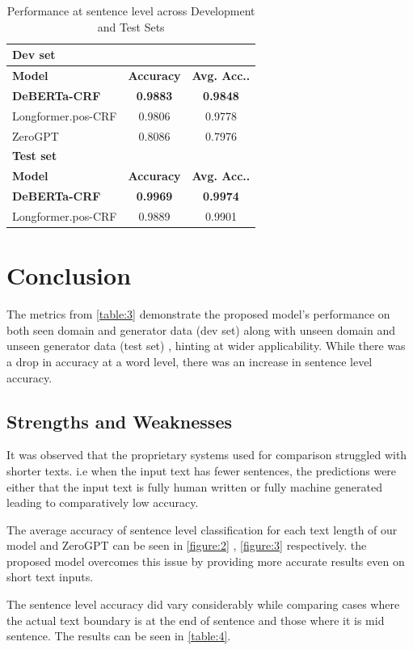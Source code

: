 \documentclass[11pt]{article}
\begin{document}
\begin{table}[!ht]
\begin{tabular}{|l|c|c|}
\hline
\textbf{Dev set} & & \\
\hline
\textbf{Model} & \textbf{Accuracy} & \textbf{Avg. Acc..} \\
\hline
\textbf{DeBERTa-CRF} & \textbf{0.9883} & \textbf{0.9848} \\
Longformer.pos-CRF & 0.9806 & 0.9778 \\
ZeroGPT & 0.8086 & 0.7976 \\
\hline
\textbf{Test set} & & \\
\hline
\textbf{Model} & \textbf{Accuracy} & \textbf{Avg. Acc..} \\
\hline
\textbf{DeBERTa-CRF} & \textbf{0.9969} & \textbf{0.9974} \\
Longformer.pos-CRF & 0.9889 & 0.9901 \\
\hline
\end{tabular}
\caption{Performance at sentence level across Development and Test Sets}
\label{table:3}
\end{table}

\section{Conclusion}
The metrics from \autoref{table:3} demonstrate the proposed model's performance on both seen domain and generator data (dev set) along with unseen domain and unseen generator data (test set) , hinting at wider applicability. While there was a drop in accuracy at a word level, there was an increase in sentence level accuracy. 

\subsection{Strengths and Weaknesses}
It was observed that the proprietary systems used for comparison struggled with shorter texts. i.e when the input text has fewer sentences, the predictions were either that the input text is fully human written or fully machine generated leading to comparatively low accuracy.

The average accuracy of sentence level classification for each text length of our model and ZeroGPT can be seen in \autoref{figure:2} , \autoref{figure:3} respectively. the proposed model overcomes this issue by providing more accurate results even on short text inputs. 

The sentence level accuracy did vary considerably while comparing cases where the actual text boundary is at the end of sentence and those where it is mid sentence. The results can be seen in \autoref{table:4}.
\end{document}
